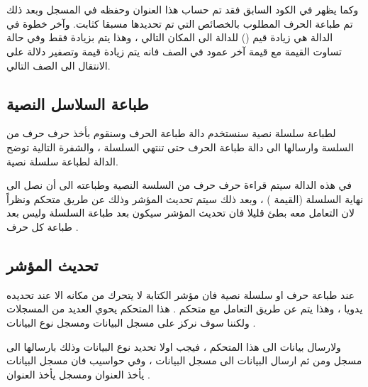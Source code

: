 \documentclass[document.tex]{subfiles}
\begin{document}
\begin{english}
\\
\\
\end{english}

وكما يظهر في الكود السابق فقد تم حساب هذا العنوان وحفظه في المسجل   وبعد ذلك تم طباعة الحرف المطلوب بالخصائص التي تم تحديدها مسبقا كثابت. وآخر خطوة في الدالة هي زيادة قيم () للدالة الى المكان التالي ، وهذا يتم بزيادة  فقط وفي حالة تساوت القيمة مع قيمة آخر عمود في الصف فانه يتم زيادة قيمة  وتصفير  دلالة على الانتقال الى الصف التالي.

\subsection{طباعة السلاسل النصية }
لطباعة سلسلة نصية سنستخدم دالة طباعة الحرف وسنقوم بأخذ حرف حرف من السلسة وارسالها الى دالة طباعة الحرف حتى تنتهي السلسلة ، والشفرة التالية توضح الدالة  لطباعة سلسلة نصية.

\begin{english}
\lstset{numberstyle=\tiny,numbers=left,stepnumber=1,numbersep=5pt,tabsize=2,extendedchars=true,breaklines=true,frame=b,showspaces=false, showtabs=false,xleftmargin=10pt,framexleftmargin=10pt,framexrightmargin=5pt,framexbottommargin=4pt,showstringspaces=false,language=[x86masm]Assembler}


\end{english}

في هذه الدالة سيتم قراءة حرف حرف من السلسة النصية وطباعته الى أن نصل الى نهاية السلسلة (القيمة ) ، وبعد ذلك سيتم تحديث المؤشر وذلك عن طريق متحكم  ونظراً لان التعامل معه بطئ قليلا فان تحديث المؤشر سيكون بعد طباعة السلسلة وليس بعد طباعة كل حرف .

\subsection{تحديث المؤشر }
عند طباعة حرف او سلسلة نصية فان مؤشر الكتابة لا يتحرك من مكانه الا عند تحديده يدويا ، وهذا يتم عن طريق التعامل مع متحكم  . هذا المتحكم يحوي العديد من المسجلات ولكننا سوف نركز على مسجل البيانات  ومسجل نوع البيانات .

ولارسال بيانات الى هذا المتحكم ، فيجب اولا تحديد نوع البيانات وذلك بارسالها الى مسجل  ومن ثم ارسال البيانات الى مسجل البيانات  ، وفي حواسيب  فان مسجل البيانات يأخذ العنوان  ومسجل  يأخذ العنوان .
\end{document}
